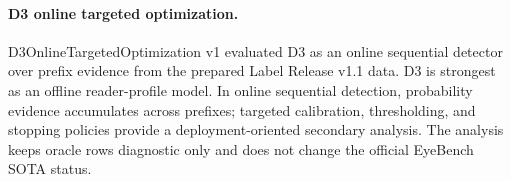 \paragraph{D3 online targeted optimization.}
D3OnlineTargetedOptimization v1 evaluated D3 as an online sequential detector over prefix evidence from the prepared Label Release v1.1 data. D3 is strongest as an offline reader-profile model. In online sequential detection, probability evidence accumulates across prefixes; targeted calibration, thresholding, and stopping policies provide a deployment-oriented secondary analysis. The analysis keeps oracle rows diagnostic only and does not change the official EyeBench SOTA status.
